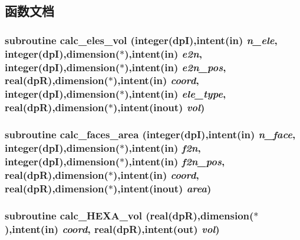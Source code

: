 \subsection{函数文档}
\hypertarget{build_2mpicxxOptInt64_2test_2ftest_8f90_ab0feb0b96896d0783a452ceb0884de54}{
\subsubsection[{calc\_\-eles\_\-vol}]{\setlength{\rightskip}{0pt plus 5cm}subroutine calc\_\-eles\_\-vol (integer(dpI),intent(in) {\em n\_\-ele}, \/  integer(dpI),dimension($\ast$),intent(in) {\em e2n}, \/  integer(dpI),dimension($\ast$),intent(in) {\em e2n\_\-pos}, \/  real(dpR),dimension($\ast$),intent(in) {\em coord}, \/  integer(dpI),dimension($\ast$),intent(in) {\em ele\_\-type}, \/  real(dpR),dimension($\ast$),intent(inout) {\em vol})}}
\label{build_2mpicxxOptInt64_2test_2ftest_8f90_ab0feb0b96896d0783a452ceb0884de54}
\hypertarget{build_2mpicxxOptInt64_2test_2ftest_8f90_a65b36ff25ffa106dab5c6b52332982e1}{
\subsubsection[{calc\_\-faces\_\-area}]{\setlength{\rightskip}{0pt plus 5cm}subroutine calc\_\-faces\_\-area (integer(dpI),intent(in) {\em n\_\-face}, \/  integer(dpI),dimension($\ast$),intent(in) {\em f2n}, \/  integer(dpI),dimension($\ast$),intent(in) {\em f2n\_\-pos}, \/  real(dpR),dimension($\ast$),intent(in) {\em coord}, \/  real(dpR),dimension($\ast$),intent(inout) {\em area})}}
\label{build_2mpicxxOptInt64_2test_2ftest_8f90_a65b36ff25ffa106dab5c6b52332982e1}
\hypertarget{build_2mpicxxOptInt64_2test_2ftest_8f90_aedcabc3101935ffa79dac989cdf8cf09}{
\subsubsection[{calc\_\-HEXA\_\-vol}]{\setlength{\rightskip}{0pt plus 5cm}subroutine calc\_\-HEXA\_\-vol (real(dpR),dimension($\ast$),intent(in) {\em coord}, \/  real(dpR),intent(out) {\em vol})}}

